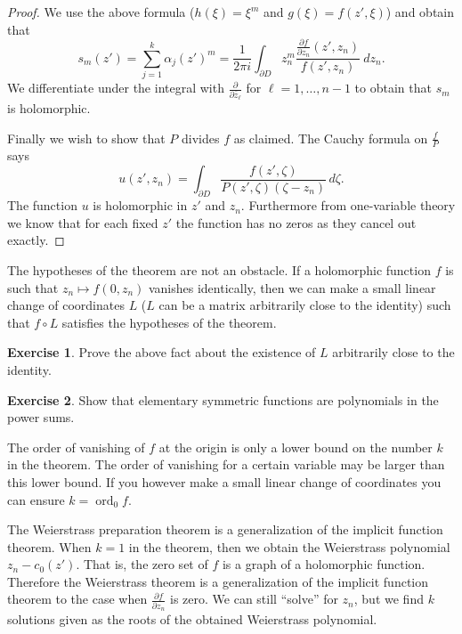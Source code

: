 \documentclass[12pt,openany]{book}
\newcommand{\ord}{\operatorname{ord}}
\theoremstyle{plain}
\theoremstyle{remark}
\theoremstyle{definition}
\newenvironment{exbox}{%
    \def\FrameCommand{\vrule width 1pt \relax\hspace {10pt}}%
    \MakeFramed {\advance \hsize -\width \FrameRestore }%
}{%
    \endMakeFramed
}
\theoremstyle{exercise}
\newtheorem{exercise}{Exercise}[section]
\theoremstyle{example}
\begin{document}
\begin{proof}
We use the above formula ($h(\xi) = \xi^m$ and $g(\xi)=f(z',\xi)$) and obtain that
\begin{equation*}
s_m(z') = 
\sum_{j=1}^k \alpha_j{(z')}^m
=
\frac{1}{2\pi i}
\int_{\partial D}
z_n^m
\frac{\frac{\partial f}{\partial z_n} (z',z_n)}{f(z',z_n)} ~dz_n .
\end{equation*}
We differentiate under the integral
with $\frac{\partial}{\partial\bar{z}_\ell}$
for $\ell=1,\ldots,{n-1}$
to obtain that $s_m$
is holomorphic.

Finally we wish to show that $P$ divides $f$ as claimed.  The Cauchy
formula on $\frac{f}{P}$ says
\begin{equation*}
u(z',z_n) = \int_{\partial D} \frac{f(z',\zeta)}{P(z',\zeta)(\zeta-z_n)} \, d\zeta .
\end{equation*}
The function $u$ is holomorphic in $z'$ and $z_n$.  Furthermore from
one-variable theory we know that for each fixed $z'$ the function has no zeros
as they cancel out exactly.
\end{proof}

The hypotheses of the theorem are not an obstacle.  If a holomorphic
function $f$ is such that $z_n \mapsto f(0,z_n)$ vanishes identically,
then we can make a small linear change of
coordinates $L$ ($L$ can be a matrix arbitrarily close to the identity) such
that $f \circ L$ satisfies the hypotheses of the theorem.

\begin{exbox}
\begin{exercise}
Prove the above fact about the existence of $L$ arbitrarily close to the
identity.
\end{exercise}

\begin{exercise}
Show that elementary symmetric functions are polynomials in the power sums.
\end{exercise}
\end{exbox}

The order of vanishing of $f$ at the origin is only a lower bound
on the number $k$ in the theorem.  The order of vanishing for a certain
variable may be larger than this lower bound.  If you however make a small
linear change of coordinates you can ensure $k = \ord_0 f$.

The Weierstrass preparation theorem is a generalization of
the implicit function theorem.  When $k=1$ in the theorem, then we obtain
the Weierstrass polynomial $z_n - c_0(z')$.  That is, the zero set of 
$f$ is a graph of a holomorphic function.
Therefore the Weierstrass theorem is a generalization of the
implicit function theorem to the case when $\frac{\partial f}{\partial z_n}$
is zero.  We can still ``solve'' for $z_n$, but we find $k$ solutions
given as the roots of the obtained Weierstrass polynomial.
\end{document}
